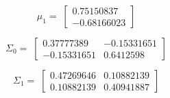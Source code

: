 \documentclass[11pt]{article}
\begin{document}
\begin{equation*}
\mu_1 = \;
\begin{bmatrix}
0.75150837\\
-0.68166023
\end{bmatrix}
\end{equation*}

\begin{equation*}
\Sigma_0 = \;
\begin{bmatrix}
0.37777389& -0.15331651\\
-0.15331651&  0.6412598
\end{bmatrix}
\end{equation*}

\begin{equation*}
\Sigma_1 = \;
\begin{bmatrix}
0.47269646& 0.10882139\\
0.10882139& 0.40941887
\end{bmatrix}
\end{equation*}
\end{document}

